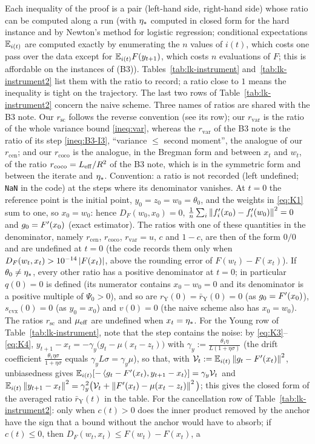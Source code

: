 Each inequality of the proof is a pair (left-hand side, right-hand side) whose ratio can be computed along a run (with $\eta_\ast$ computed in closed form for the hard instance and by Newton's method for logistic regression; conditional expectations $\mathbb{E}_{i(t)}$ are computed exactly by enumerating the $n$ values of $i(t)$, which costs one pass over the data except for $\mathbb{E}_{i(t)} F(y_{t+1})$, which costs $n$ evaluations of $F$; this is affordable on the instances of (B3)). Tables~\ref{tab:lk-instrument} and~\ref{tab:lk-instrument2} list them with the ratio to record; a ratio close to $1$ means the inequality is tight on the trajectory. The last two rows of Table~\ref{tab:lk-instrument2} concern the naive scheme. Three names of ratios are shared with the B3 note. Our $r_{\mathrm{sc}}$ follows the reverse convention (see its row); our $r_{\mathrm{var}}$ is the ratio of the whole variance bound \eqref{ineq:var}, whereas the $r_{\mathrm{var}}$ of the B3 note is the ratio of its step \eqref{ineq:B3-I3}, ``variance $\le$ second moment'', the analogue of our $r_{\mathrm{cen}}$; and our $r_{\mathrm{coco}}$ is the analogue, in the Bregman form and between $x_t$ and $w_t$, of the ratio $r_{\mathrm{coco}}=L_{\mathrm{eff}}/R^2$ of the B3 note, which is in the symmetric form and between the iterate and $\eta_\ast$. Convention: a ratio is not recorded (left undefined; \texttt{NaN} in the code) at the steps where its denominator vanishes. At $t=0$ the reference point is the initial point, $y_0=z_0=w_0=\theta_0$, and the weights in \eqref{eq:K1} sum to one, so $x_0=w_0$: hence $D_F(w_0,x_0)=0$, $\frac1n\sum_i\left\|f'_i(x_0)-f'_i(w_0)\right\|^2=0$ and $g_0=F'(x_0)$ (exact estimator). The ratios with one of these quantities in the denominator, namely $r_{\mathrm{cen}}$, $r_{\mathrm{coco}}$, $r_{\mathrm{var}}=u$, $c$ and $1-c$, are then of the form $0/0$ and are undefined at $t=0$ (the code records them only when $D_F(w_t,x_t)>10^{-14}\left|F(x_t)\right|$, above the rounding error of $F(w_t)-F(x_t)$). If $\theta_0\ne\eta_\ast$, every other ratio has a positive denominator at $t=0$; in particular $q(0)=0$ is defined (its numerator contains $x_0-w_0=0$ and its denominator is a positive multiple of $\Psi_0>0$), and so are $r_{\mathrm Y}(0)=\bar r_{\mathrm Y}(0)=0$ (as $g_0=F'(x_0)$), $s_{\mathrm{cvx}}(0)=0$ (as $y_0=x_0$) and $v(0)=0$ (the naive scheme also has $x_0=w_0$). The ratios $r_{\mathrm{sc}}$ and $\mu_{\mathrm{eff}}$ are undefined when $x_t=\eta_\ast$. For the Young row of Table~\ref{tab:lk-instrument}, note that the step contains the noise: by \eqref{eq:K3}--\eqref{eq:K4}, $y_{t+1}-x_t=-\gamma_y\big(g_t-\mu(x_t-z_t)\big)$ with $\gamma_y:=\frac{\theta_1\eta}{L(1+\eta\sigma)}$ (the drift coefficient $\frac{\theta_1\eta\sigma}{1+\eta\sigma}$ equals $\gamma_yL\sigma=\gamma_y\mu$), so that, with $\mathcal V_t:=\mathbb{E}_{i(t)}\left\|g_t-F'(x_t)\right\|^2$, unbiasedness gives $\mathbb{E}_{i(t)}[-\left\langle g_t-F'(x_t), y_{t+1}-x_t \right\rangle]=\gamma_y\mathcal V_t$ and $\mathbb{E}_{i(t)}\left\|y_{t+1}-x_t\right\|^2=\gamma_y^2\big(\mathcal V_t+\left\|F'(x_t)-\mu(x_t-z_t)\right\|^2\big)$; this gives the closed form of the averaged ratio $\bar r_{\mathrm Y}(t)$ in the table. For the cancellation row of Table~\ref{tab:lk-instrument2}: only when $c(t)>0$ does the inner product removed by the anchor have the sign that a bound without the anchor would have to absorb; if $c(t)\le0$, then $D_F(w_t,x_t)\le F(w_t)-F(x_t)$, a 